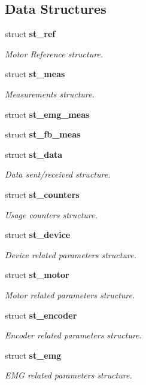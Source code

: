 \subsection*{Data Structures}
\begin{DoxyCompactItemize}
\item 
struct \textbf{ st\+\_\+ref}
\begin{DoxyCompactList}\small\item\em Motor Reference structure. \end{DoxyCompactList}\item 
struct \textbf{ st\+\_\+meas}
\begin{DoxyCompactList}\small\item\em Measurements structure. \end{DoxyCompactList}\item 
struct \textbf{ st\+\_\+emg\+\_\+meas}
\item 
struct \textbf{ st\+\_\+fb\+\_\+meas}
\item 
struct \textbf{ st\+\_\+data}
\begin{DoxyCompactList}\small\item\em Data sent/received structure. \end{DoxyCompactList}\item 
struct \textbf{ st\+\_\+counters}
\begin{DoxyCompactList}\small\item\em Usage counters structure. \end{DoxyCompactList}\item 
struct \textbf{ st\+\_\+device}
\begin{DoxyCompactList}\small\item\em Device related parameters structure. \end{DoxyCompactList}\item 
struct \textbf{ st\+\_\+motor}
\begin{DoxyCompactList}\small\item\em Motor related parameters structure. \end{DoxyCompactList}\item 
struct \textbf{ st\+\_\+encoder}
\begin{DoxyCompactList}\small\item\em Encoder related parameters structure. \end{DoxyCompactList}\item 
struct \textbf{ st\+\_\+emg}
\begin{DoxyCompactList}\small\item\em E\+MG related parameters structure. \end{DoxyCompactList}\item 

\end{DoxyCompactItemize}
